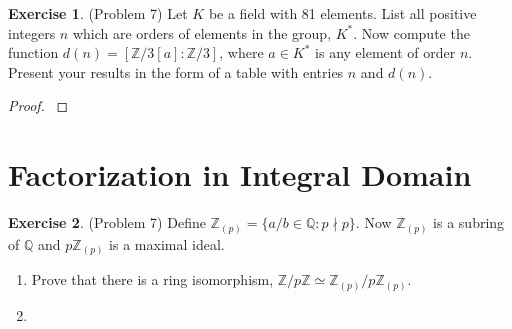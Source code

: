 \documentclass[12pt, psamsfonts]{amsart}
\theoremstyle{definition}
\newtheorem*{exer}{Exercise}
\theoremstyle{remark}
\numberwithin{equation}{section}
\begin{document}
\begin{exer}{(Problem 7)}
  Let $K$ be a field with 81 elements.
  List all positive integers $n$ which are orders of elements in the group, $K^*$.
  Now compute the function $d(n) = [\mathbb{Z}/3[a]:\mathbb{Z}/3]$, where $a \in K^*$ is any element of order $n$.
  Present your results in the form of a table with entries $n$ and $d(n)$.
\end{exer}

\begin{proof}
  $ $
\end{proof}

\section{Factorization in Integral Domain}

\begin{exer}{(Problem 7)}
  Define $\mathbb{Z}_{(p)} = \{ a / b \in \mathbb{Q} : p \nmid p \}$.
  Now $\mathbb{Z}_{(p)}$ is a subring of $\mathbb{Q}$ and $p\mathbb{Z}_{(p)}$ is a maximal ideal.
  \begin{enumerate}[label=(\roman*)]
    \item
      Prove that there is a ring isomorphism, $\mathbb{Z}/p\mathbb{Z} \simeq \mathbb{Z}_{(p)} / p\mathbb{Z}_{(p)}$.
    \item
  \end{enumerate}
\end{exer}
\end{document}

